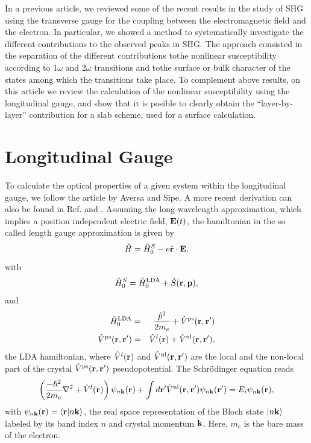 \documentclass{article}
\begin{document}
In a previous article,\cite{mendoza_epioptics_2001} we reviewed some of the recent results in the study of SHG using the transverse gauge for the coupling between the electromagnetic field and the electron. In particular, we
showed a method to systematically investigate the different contributions to the observed peaks in SHG.\cite{arzate_microscopic_2001} The approach consisted in the separation of the different contributions tothe nonlinear susceptibility according to 1$\omega$ and 2$\omega$ transitions and tothe  surface or bulk character of the states among which the transitions take place. To complement above results, on this article we review the calculation of the nonlinear susceptibility using the longitudinal gauge, and show that it is posible to clearly obtain the ``layer-by-layer'' contribution for a slab scheme, used for a surface calculation.

\section{Longitudinal Gauge}\label{longi}

To calculate the optical properties of a given system
within the longitudinal gauge, we follow the article by
Aversa and Sipe.\cite{aversa_nonlinear_1995} A more recent derivation can also be
found in
Ref. \cite{sipe_second-order_2000} and \cite{lambrecht_band_2000}.
 Assuming the long-wavelength approximation,
which implies a position independent electric field, 
$\mathbf{E}(t)$,  
the hamiltonian in the so called length gauge approximation
is given by
\begin{equation}\label{ache}
\hat{H}=\hat{H}^S_0-e \hat{\mathbf{r}} \cdot \mathbf{E},
\end{equation}
with
\begin{eqnarray}\label{ache.1}
\hat H^S_0=\hat H^{\mathrm{LDA}}_0
 + \hat S(\mathbf{r},\mathbf{p})
,
\end{eqnarray} 
and
\begin{eqnarray}\label{ache.2}
\hat H^{\mathrm{LDA}}_0&=&\frac{\hat p^2}{2m_e}  + \hat V^{\mathrm{ps}}(\mathbf{r},\mathbf{r}')
\nonumber\\
\hat V^{\mathrm{ps}}(\mathbf{r},\mathbf{r}')
&=&\hat V^l(\mathbf{r}) + \hat V^{\mathrm{nl}}(\mathbf{r},\mathbf{r}')
,
\end{eqnarray}  
the LDA hamiltonian, 
where $\hat V^l(\mathbf{r})$ and $\hat V^{\mathrm{nl}}(\mathbf{r},\mathbf{r}')$ are the local and
the non-local part of the  
crystal $\hat V^{\mathrm{ps}}(\mathbf{r},\mathbf{r}')$ pseudopotential.
The Schr\"odinger equation reads
\begin{eqnarray}\label{ache.4}
\left(
\frac{-\hbar^2}{2m_e}\nabla^2
 + \hat V^l(\mathbf{r})\right)\psi_{n\mathbf{k}}(\mathbf{r})
 + \int d\mathbf{r}'\hat V^{\mathrm{nl}}(\mathbf{r},\mathbf{r}')\psi_{n\mathbf{k}}(\mathbf{r}')
=E_i\psi_{n\mathbf{k}}(\mathbf{r})
,
\end{eqnarray} 
with $\psi_{n\mathbf{k}}(\mathbf{r})=\langle {\mathbf{r}} | {n\mathbf{k}} \rangle$, the real space
representation of the Bloch state $| n\mathbf{k} \rangle$
labeled
by  its
band index $n$ and crystal momentum $\mathbf{k}$. 
Here, $m_e$ is the 
bare mass of the 
electron.
\end{document}
